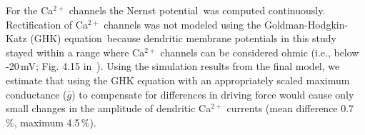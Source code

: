 \documentclass[12pt]{article}
\begin{document}
For the Ca$^{2+}$ channels the Nernst potential\,\cite{Hille:1991zr} was
computed continuously. Rectification of
Ca$^{2+}$ channels was not modeled using the Goldman-Hodgkin-Katz (GHK) equation\,\cite{Hille:1991zr}
because dendritic membrane potentials in this
study stayed within a range where Ca$^{2+}$  channels can be considered
ohmic (i.e., below -20\,mV; Fig. 4.15 in\,\cite{Hille:1991zr} ). Using
the simulation results from the final model, we estimate that using
the GHK equation with an appropriately scaled maximum conductance
($\bar g$) to compensate for differences in driving force would
cause only small changes in the amplitude of dendritic Ca$^{2+}$
currents (mean difference 0.7\,\%, maximum 4.5\,\%).



\end{document}
